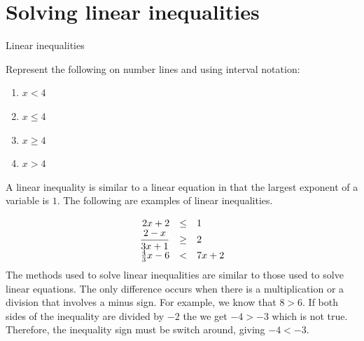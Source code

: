 \section{Solving linear inequalities}
\nopagebreak


\begin{activity}{Linear inequalities}
{
Represent the following on number lines and using interval notation:
\begin{enumerate}[noitemsep, label=\textbf{\arabic*}. ] 
\item $x<4$
\item $x\leq 4$
\item $x\geq 4$
\item $x>4$
\end{enumerate}
}
\end{activity}

A linear inequality is similar to a linear equation in that the largest exponent of a variable is $1$. The following are examples of linear inequalities.\par 

\begin{equation*}
\begin{array}{ccc}\hfill 2x+2& \leq& 1\hfill \\ \hfill \dfrac{2-x}{3x+1}&\geq& 2\hfill \\ \hfill \frac{4}{3}x-6&<& 7x+2\hfill \end{array}
\end{equation*}
The methods used to solve linear inequalities are similar to those used to
solve linear equations. The only difference occurs when there is a
multiplication or a division that involves a minus sign. For example, we know
that $8>6$. If both sides of the inequality are divided by $-2$ the we get $-4 > -3$ which is not true. Therefore, the inequality sign must be switch around, giving
$-4<-3$.


